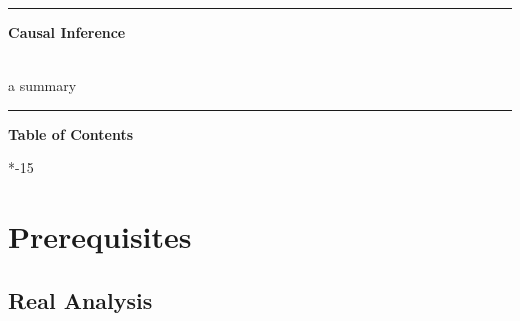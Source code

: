 \documentclass[8pt,twoside]{extarticle}
\makeatletter
\renewcommand\tableofcontents{%
    \@starttoc{toc}%
}
\newcommand*{\setupTOC}{%
\titleformat{\chapter}{}{}{0pt}{} 

\titlespacing*{\chapter}{0pt}
{*7} %
{*-15}  %
}
\makeatother
\begin{document}
\vspace*{18em}

\hrule
\begin{center}
{\fontsize{30}{60}\selectfont \textbf{Causal Inference}} \\ \

{\fontsize{20}{60}\selectfont a summary}
\end{center}
\hrule


\newpage
 
{\Huge \bfseries Table of Contents \bigskip}    

\begin{multicols}{2}
{\setupTOC  \tableofcontents}
\end{multicols}



\raggedright %
\setlength{\columnseprule}{0.3pt} %





\section{Prerequisites}

\subsection[Real Analysis]{Real Analysis \citep{abbott2015understanding}}
\end{document}

